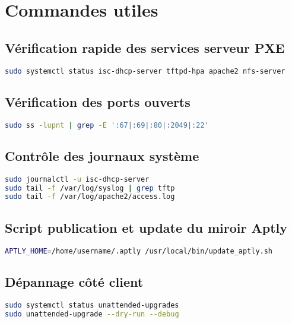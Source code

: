 \documentclass[a4paper,12pt]{article}
\begin{document}
\section{Commandes utiles}

\subsection{Vérification rapide des services serveur PXE}

\begin{lstlisting}[language=bash]
sudo systemctl status isc-dhcp-server tftpd-hpa apache2 nfs-server
\end{lstlisting}

\subsection{Vérification des ports ouverts}

\begin{lstlisting}[language=bash]
sudo ss -lupnt | grep -E ':67|:69|:80|:2049|:22'
\end{lstlisting}

\subsection{Contrôle des journaux système}

\begin{lstlisting}[language=bash]
sudo journalctl -u isc-dhcp-server
sudo tail -f /var/log/syslog | grep tftp
sudo tail -f /var/log/apache2/access.log
\end{lstlisting}

\subsection{Script publication et update du miroir Aptly}

\begin{lstlisting}[language=bash]
APTLY_HOME=/home/username/.aptly /usr/local/bin/update_aptly.sh
\end{lstlisting}

\subsection{Dépannage côté client}

\begin{lstlisting}[language=bash]
sudo systemctl status unattended-upgrades
sudo unattended-upgrade --dry-run --debug
\end{lstlisting}
\end{document}
